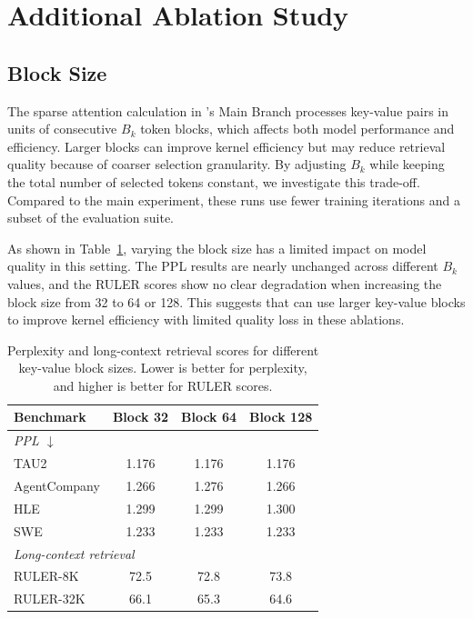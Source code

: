 \section{Additional Ablation Study}
\label{app:additional-ablation}


\subsection{Block Size}
\label{app:prelim-block-size}

The sparse attention calculation in \method{}'s Main Branch processes key-value pairs in units of consecutive $B_k$ token blocks, which affects both model performance and efficiency. Larger blocks can improve kernel efficiency but may reduce retrieval quality because of coarser selection granularity. By adjusting $B_k$ while keeping the total number of selected tokens constant, we investigate this trade-off. Compared to the main experiment, these runs use fewer training iterations and a subset of the evaluation suite.

As shown in Table~\ref{tab:block-ablation}, varying the block size has a limited impact on model quality in this setting. The PPL results are nearly unchanged across different $B_k$ values, and the RULER scores show no clear degradation when increasing the block size from 32 to 64 or 128. This suggests that \method{} can use larger key-value blocks to improve kernel efficiency with limited quality loss in these ablations.

\begin{table}[!htb]
\centering
\caption{Perplexity and long-context retrieval scores for different
key-value block sizes. Lower is better for perplexity, and higher is
better for RULER scores.}
\label{tab:block-ablation}
\small
\begin{tabular}{l c c c}
\toprule
Benchmark & Block 32 & Block 64 & Block 128 \\
\midrule
\multicolumn{4}{l}{\textit{PPL $\downarrow$}} \\
TAU2                             & 1.176 & 1.176 & 1.176 \\
AgentCompany                     & 1.266 & 1.276 & 1.266 \\
HLE                              & 1.299 & 1.299 & 1.300 \\
SWE                              & 1.233 & 1.233 & 1.233 \\
\midrule
\multicolumn{4}{l}{\textit{Long-context retrieval}} \\
RULER-8K                          & 72.5 & 72.8 & 73.8 \\
RULER-32K                          & 66.1 & 65.3 & 64.6 \\
\bottomrule
\end{tabular}
\end{table}



